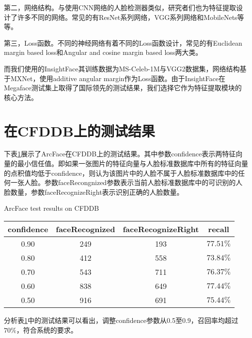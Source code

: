 第二，网络结构。与使用CNN网络的人脸检测器类似，研究者们也为特征提取设计了许多不同的网络。常见的有ResNet系列网络\cite{he2016deep}，VGG系列网络\cite{simonyan2014very}和MobileNets\cite{howard2017mobilenets}等等。

第三，Loss函数。不同的神经网络有着不同的Loss函数设计，常见的有Euclidean margin based loss和Angular and cosine margin based loss两大类。

而我们使用的InsightFace其训练数据为MS-Celeb-1M\cite{guo2016msceleb}与VGG2\cite{cao2017vggface2}数据集，网络结构基于MXNet\cite{chen2015mxnet}，使用additive angular margin作为Loss函数。由于InsightFace在Megaface测试集上取得了国际领先的测试结果，我们选择它作为特征提取模块的核心方法。

\section{在CFDDB上的测试结果}

下表\ref{tab:arcface}展示了ArcFace在CFDDB上的测试结果。其中参数confidence表示两特征向量的最小信任值。即如果一张图片的特征向量与人脸标准数据库中所有的特征向量的点积值均低于confidence，则认为该图片中的人脸不属于人脸标准数据库中的任何一张人脸。参数faceRecongnized参数表示当前人脸标准数据库中的可识别的人脸数量，参数faceRecognizeRight表示识别正确的人脸数量。

\begin{table}[!hpb]
	\centering
	{ArcFace test results on CFDDB}
	\label{tab:arcface}
	\begin{tabular}{ ccc | c }
		\hline
		confidence & faceRecognized & faceRecognizeRight &  recall\\
		\hline
		0.90 & 249 & 193 & $77.51\%$\\
		0.80 & 412 & 558 & $73.84\%$\\
		0.70 & 543 & 711 & $76.37\%$\\
		0.60 & 838 & 649 & $77.44\%$\\
		0.50 & 916 & 691 & $75.44\%$\\
		\hline
	\end{tabular}
\end{table}

分析表\ref{tab:arcface}中的测试结果可以看出，调整confidence参数从0.5至0.9，召回率均超过$70\%$，符合系统的要求。